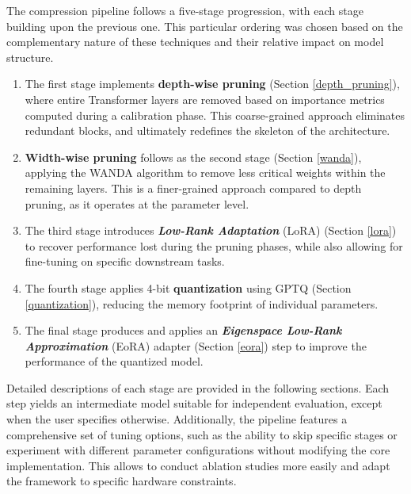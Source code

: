 The compression pipeline follows a five-stage progression, with each stage building upon the previous one. This particular ordering was chosen based on the complementary nature of these techniques and their relative impact on model structure.

\begin{enumerate}
    \item The first stage implements \textbf{depth-wise pruning} (Section \ref{depth_pruning}), where entire Transformer layers are removed based on importance metrics computed during a calibration phase. This coarse-grained approach eliminates redundant blocks, and ultimately redefines the skeleton of the architecture.

    \item \textbf{Width-wise pruning} follows as the second stage (Section \ref{wanda}), applying the WANDA algorithm \cite{wanda} to remove less critical weights within the remaining layers. This is a finer-grained approach compared to depth pruning, as it operates at the parameter level.

    \item The third stage introduces \textbf{\textit{Low-Rank Adaptation}} (LoRA) \cite{lora} (Section \ref{lora}) to recover performance lost during the pruning phases, while also allowing for fine-tuning on specific downstream tasks.

    \item The fourth stage applies 4-bit  \textbf{quantization} using GPTQ \cite{gptq_quantization} (Section \ref{quantization}), reducing the memory footprint of individual parameters.

    \item The final stage produces and applies an \textbf{\textit{Eigenspace Low-Rank Approximation}} (EoRA) \cite{eora} adapter (Section \ref{eora}) step to improve the performance of the quantized model.
\end{enumerate}

Detailed descriptions of each stage are provided in the following sections. Each step yields an intermediate model suitable for independent evaluation, except when the user specifies otherwise. Additionally, the pipeline features a comprehensive set of tuning options, such as the ability to skip specific stages or experiment with different parameter configurations without modifying the core implementation. This allows to conduct ablation studies more easily and adapt the framework to specific hardware constraints.

